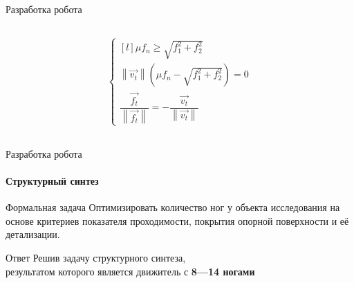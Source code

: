 \documentclass[aspectratio=169,xcolor=table,10pt]{beamer}
\begin{document}
\begin{frame}[t]{Разработка робота}
\begin{columns}[T,onlytextwidth]
\begin{column}{0.29\textwidth}
\begin{figure}[H]
                \label{fig:contact_interaction.png}
            \end{figure}
            \vspace{-1cm}
            \begin{align*}
                \left\{\begin{matrix*}[l]
                           \mu f_n \geqslant \sqrt{f_1^2 + f_2^2}\\
                           \left\lVert \vec{v_t}\right\rVert (\mu f_n - \sqrt{f_1^2 + f_2^2}) = 0\\
                           \dfrac{\vec{f_t}}{\left\lVert \vec{f_t}\right\rVert } = - \dfrac{\vec{v_t}}{\left\lVert \vec{v_t}\right\rVert }
                       \end{matrix*}\right.
            \end{align*}
        \end{column}
    \end{columns}
\end{frame}

\begin{frame}[t]{Разработка робота}
    \framesubtitle{Структурный синтез}
    {\large\begin{block}{Формальная задача}
            Оптимизировать количество ног у объекта исследования на основе критериев показателя проходимости, покрытия опорной поверхности и её детализации.
        \end{block}}
    {\large\begin{alertblock}{Ответ}
            \centering Решив задачу структурного синтеза,\\ результатом которого является движитель с \textbf{8---14 ногами}
        \end{alertblock}}
\end{frame}
\end{document}
